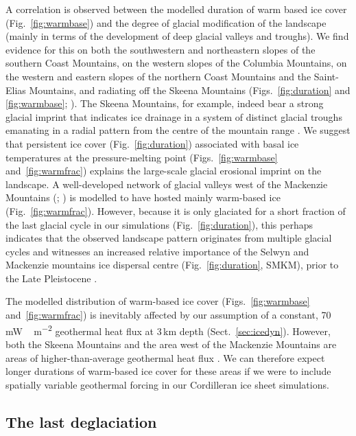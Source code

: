 \documentclass[tc]{copernicus}
\begin{document}
A correlation is observed between the modelled duration of warm based ice cover
(Fig.~\ref{fig:warmbase}) and the degree of glacial modification of the
landscape (mainly in terms of the development of deep glacial valleys and
troughs). We find evidence for this on both the southwestern and northeastern
slopes of the southern Coast Mountains, on the western slopes of the Columbia
Mountains, on the western and eastern slopes of the northern Coast Mountains
and the Saint-Elias Mountains, and radiating off the Skeena Mountains
(Figs.~\ref{fig:duration} and \ref{fig:warmbase};
\citealp[Fig.~2]{Kleman.etal.2010}).
The Skeena Mountains, for example, indeed bear a strong glacial imprint that
indicates ice drainage in a system of distinct glacial troughs emanating in a
radial pattern from the centre of the mountain range
\citep[Fig.~2]{Kleman.etal.2010}. We suggest that
persistent ice cover (Fig.~\ref{fig:duration}) associated with basal ice
temperatures at the pressure-melting point (Figs.~\ref{fig:warmbase}
and~\ref{fig:warmfrac}) explains the large-scale glacial erosional imprint on
the landscape. A well-developed network of glacial valleys west of
the Mackenzie Mountains (\citealp[Fig.~2]{Kleman.etal.2010}; \citealp[Fig.~8]
{Stroeven.etal.2010}) is modelled to have hosted mainly warm-based ice
(Fig.~\ref{fig:warmfrac}). However, because it is only glaciated for a
short fraction of the last glacial cycle in our simulations
(Fig.~\ref{fig:duration}), this perhaps indicates that
the observed landscape pattern originates from multiple glacial cycles and
witnesses an increased relative importance of the Selwyn and Mackenzie
mountains ice dispersal centre (Fig.~\ref{fig:duration}, SMKM), prior
to the Late Pleistocene \citep[cf.][]{Ward.etal.2008, Demuro.etal.2012}.

The modelled distribution of warm-based ice cover (Figs.~\ref{fig:warmbase}
and~\ref{fig:warmfrac}) is inevitably affected by our assumption of a constant,
70\,\unit{mW\,m^{-2}} geothermal heat flux at 3\,km depth
(Sect.~\ref{sec:icedyn}). However, both the Skeena Mountains and the area
west of the Mackenzie Mountains are areas of higher-than-average geothermal
heat flux \citep{Blackwell.Richards.2004}. We can therefore expect longer
durations of warm-based ice cover for these areas if we were to include
spatially variable geothermal forcing in our Cordilleran ice sheet simulations.


\subsection{The last deglaciation}
\end{document}

